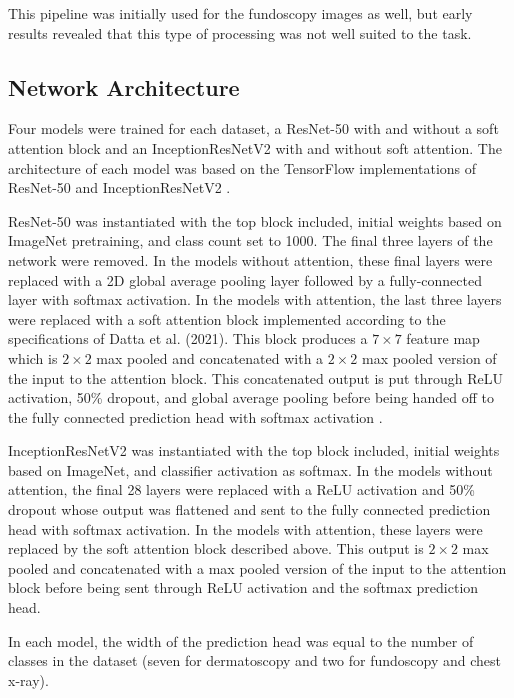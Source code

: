 \documentclass[10pt,twocolumn,letterpaper]{article}
\begin{document}
      

      This pipeline was initially used for the fundoscopy images as well, but early results revealed that this type of processing was not well suited to the task.

    \subsection{Network Architecture}
      Four models were trained for each dataset, a ResNet-50 with and without a soft attention block and an InceptionResNetV2 with and without soft attention. The architecture of each model was based on the TensorFlow \cite{TensorFlow} implementations of ResNet-50 \cite{ResNetImplementation} and InceptionResNetV2 \cite{InceptionImplementation}.
      
      ResNet-50 was instantiated with the top block included, initial weights based on ImageNet \cite{ImageNet} pretraining, and class count set to 1000. The final three layers of the network were removed. In the models without attention, these final layers were replaced with a 2D global average pooling layer followed by a fully-connected layer with softmax activation. In the models with attention, the last three layers were replaced with a soft attention block implemented according to the specifications of Datta et al. (2021). This block produces a $7 \times 7$ feature map which is $2 \times 2$ max pooled and concatenated with a $2 \times 2$ max pooled version of the input to the attention block. This concatenated output is put through ReLU activation, 50\% dropout, and global average pooling before being handed off to the fully connected prediction head with softmax activation \cite{AttentionSkinCancerClassification}.
      
      InceptionResNetV2 \cite{InceptionResNet} was instantiated with the top block included, initial weights based on ImageNet, and classifier activation as softmax. In the models without attention, the final 28 layers were replaced with a ReLU activation and 50\% dropout whose output was flattened and sent to the fully connected prediction head with softmax activation. In the models with attention, these layers were replaced by the soft attention block described above. This output is $2 \times 2$ max pooled and concatenated with a max pooled version of the input to the attention block before being sent through ReLU activation and the softmax prediction head.

      In each model, the width of the prediction head was equal to the number of classes in the dataset (seven for dermatoscopy and two for fundoscopy and chest x-ray).
\end{document}
